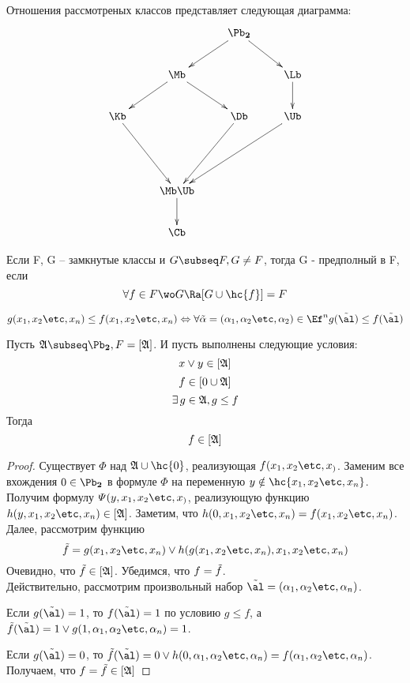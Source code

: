 \documentclass[unicode, 10pt, a4paper, oneside, fleqn]{article}
\begin{document}
Отношения рассмотреных классов представляет следующая диаграмма:
\begin{displaymath}
  \xymatrix{
    &&\ar[ld] \PD \ar[rd]&\\
    &\ar[ld]\Mb\ar[rd]&&\Lb\ar[d]\\
    \Kb\ar[ddr]&&\Db\ar[ddl]&\Ub\ar[lldd]\\
    &&&\\
    &\Mb\Ub\ar[d]&&\\
    &\Cb&&\\
  }
\end{displaymath}
\begin{df}
  Если F, G -- замкнутые классы и $G \subseq F, G \neq F$, тогда G - предполный в F, если 
  \begin{displaymath}
    \forall f \in F\wo G \Ra [G\cup\hc{f}] = F
  \end{displaymath}
\end{df}
\begin{df}
  \begin{displaymath}
    g(\set[x]{n}) \le f(\set[x]{n}) \Leftrightarrow \allset{n} g(\alt) \le f(\alt)
  \end{displaymath}
\end{df}
\begin{lemma}
  Пусть $\ag \subseq \PD, F = [\ag]$. И пусть выполнены следующие условия:
  \label{ast}
  \begin{equation*}
      x\vee{y} \in [\mathfrak{A}]
  \end{equation*}
  \begin{equation*}
      f \in [{0} \cup \mathfrak{A}]
  \end{equation*}
  \begin{equation*}
    \exists\, g \in \mathfrak{A}, g \le f    
  \end{equation*}
  Тогда 
  \begin{displaymath}
    f \in [\mathfrak{A}]
  \end{displaymath}
\end{lemma}
\begin{proof}
  Существует $\varPhi$ над $\ag \cup \hc{0}$, реализующая $f(\set[x])$. 
  Заменим все вхождения $0\in\PD$ в формуле $\varPhi$ на переменную $y \notin \hc{\set[x]{n}}$.
  Получим формулу $\varPsi(y,\set[x])$, реализующую функцию $h(y,\set[x]{n}) \in [\ag]$.
  Заметим, что $h(0,\set[x]{n}) = f(\set[x]{n})$.
  Далее, рассмотрим функцию 
  \begin{displaymath}
    \tilde f = g(\set[x]{n}) \vee h(g(\set[x]{n}), \set[x]{n})
  \end{displaymath}
  Очевидно, что $\tilde{f} \in [\mathfrak{A}]$. Убедимся, что $f = \tilde{f}$.\\
  Действительно, рассмотрим произвольный набор $\alt =(\set{n})$.
  \par Если $g(\alt) = 1$, то $f(\alt) = 1$ по условию $g \le f$, а $\tilde f(\tilde \al) = 1 \vee g(1,\set{n}) =1$.
  \par Если $g(\alt) = 0$, то $\tf(\alt) =0 \vee h(0,\set{n}) =f(\set{n})$.\\
  Получаем, что $ f = \tilde{f} \in [\mathfrak{A}]$
\end{proof}
\end{document}
